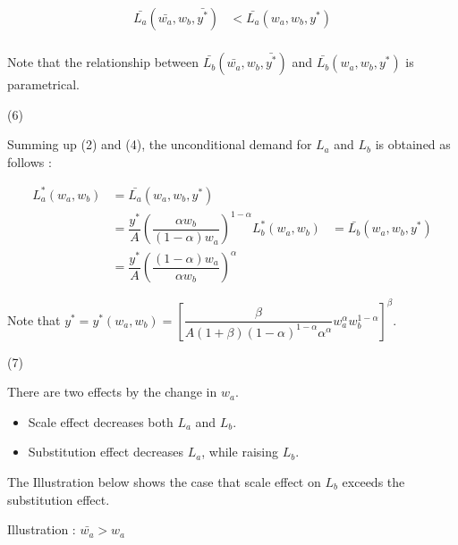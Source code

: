 \documentclass[dvipdfmx]{jsarticle}
\begin{document}
\begin{enumerate}
  \begin{align*}
  \bar{L_a}(\bar{w_a}, w_b, \bar{y^*}) &< \bar{L_a}(w_a, w_b, y^*) \\
  \end{align*}
 
 Note that the relationship between $\bar{L_b}(\bar{w_a}, w_b, \bar{y^*})$ and $\bar{L_b}(w_a, w_b, y^*)$ is parametrical.
 
 (6)
 
 Summing up (2) and (4), the unconditional demand for $L_a$ and $L_b$ is obtained as follows :
 
  \begin{align*}
  L^*_a(w_a, w_b) &= \bar{L_a}(w_a, w_b, y^*) \\
  &= \dfrac{y^*}{A} \left( \dfrac{\alpha w_b}{(1-\alpha) w_a} \right)^{1-\alpha}
  L^*_b(w_a, w_b) &= \bar{L_b}(w_a, w_b, y^*) \\
  &= \dfrac{y^*}{A} \left( \dfrac{(1-\alpha) w_a}{\alpha w_b} \right)^{\alpha}
  \end{align*}
 
 Note that $y^* = y^* (w_a, w_b) = \left[ \dfrac{\beta}{A(1+\beta)(1-\alpha)^{1-\alpha} \alpha^\alpha}
  w_a^{\alpha} w_b^{1-\alpha} \right]^{\beta}$.
  
 (7)
 
 There are two effects by the change in $w_a$.
 
 \begin{itemize}
 
  \item Scale effect decreases both $L_a$ and $L_b$.
 
  \item Substitution effect decreases $L_a$, while raising $L_b$.
 
 \end{itemize}
 
 The Illustration below shows the case that scale effect  on $L_b$ exceeds the substitution effect.
 
 \begin{center}
 
 \newpage
 
 Illustration : $\bar{w_a} > w_a$
 
 

\end{center}
\end{enumerate}
\end{document}
